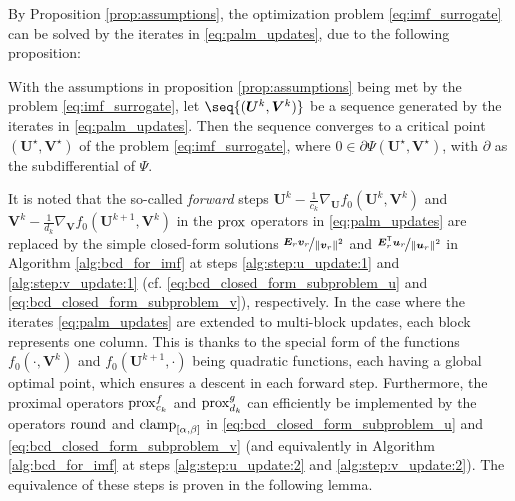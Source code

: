 By Proposition \ref{prop:assumptions}, the optimization problem \eqref{eq:imf_surrogate} can be solved by the iterates in \eqref{eq:palm_updates}, due to the following proposition:
\begin{proposition}\label{prop:convergence}
    With the assumptions in proposition \ref{prop:assumptions} being met by the problem \eqref{eq:imf_surrogate}, let $\seq{(\bm U^k, \bm V^k)}$ be a sequence generated by the iterates in \eqref{eq:palm_updates}. Then the sequence converges to a critical point $(\bm U^\star, \bm V^\star)$ of the problem \eqref{eq:imf_surrogate}, where $0 \in \partial \Psi(\bm U^\star, \bm V^\star)$, with $\partial$ as the subdifferential of $\Psi$.
\end{proposition}

It is noted that the so-called \emph{forward} steps $\bm U^k - \frac{1}{c_k} \nabla_{\bm U} f_0(\bm U^k, \bm V^k)$ and $\bm V^k - \frac{1}{d_k} \nabla_{\bm V} f_0(\bm U^{k+1}, \bm V^k)$ in the $\operatorname{prox}$ operators in \eqref{eq:palm_updates} are replaced by the simple closed-form solutions $\nicefrac{\bm{E}_r \bm{v}_r}{\lVert \bm{v}_r \rVert^2}$ and $\nicefrac{\bm{E}_r^\mathsf{T} \bm{u}_r}{\lVert \bm{u}_r \rVert^2}$ in Algorithm \ref{alg:bcd_for_imf} at steps \ref{alg:step:u_update:1} and \ref{alg:step:v_update:1} (cf. \eqref{eq:bcd_closed_form_subproblem_u} and \eqref{eq:bcd_closed_form_subproblem_v}), respectively. In the case where the iterates \eqref{eq:palm_updates} are extended to multi-block updates, each block represents one column. This is thanks to the special form of the functions $f_0(\cdot, \bm V^k)$ and $f_0(\bm U^{k+1}, \cdot)$ being quadratic functions, each having a global optimal point, which ensures a descent in each forward step.
Furthermore, the proximal operators $\operatorname{prox}^f_{c_k}$ and $\operatorname{prox}^g_{d_k}$ can efficiently be implemented by the operators $\operatorname{round}$ and $\operatorname{clamp}_{[\alpha,\beta]}$ in \eqref{eq:bcd_closed_form_subproblem_u} and \eqref{eq:bcd_closed_form_subproblem_v} (and equivalently in Algorithm \ref{alg:bcd_for_imf} at steps \ref{alg:step:u_update:2} and \ref{alg:step:v_update:2}). The equivalence of these steps is proven in the following lemma.

